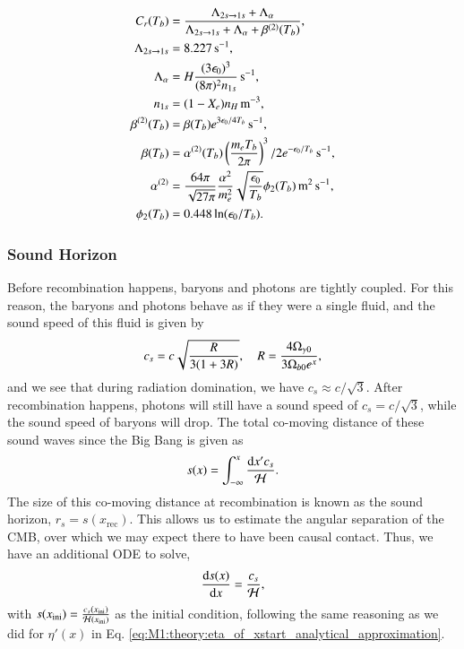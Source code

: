 \begin{subequations}
    \begin{align}
        C_r(T_b) &= \frac{\Lambda_{2s\to1s} + \Lambda_\alpha}{\Lambda_{2s\to1s} + \Lambda_\alpha + \beta^{(2)}(T_b)}, \\
        \Lambda_{2s\to1s} &= 8.227\,\mathrm{s^{-1}}, \\
        \Lambda_\alpha &= H \frac{(3\epsilon_0)^3}{(8\pi)^2 n_{1s}}\,\mathrm{s^{-1}}, \\
        n_{1s} &= (1-X_e) n_H \,\mathrm{m^{-3}}, \\
        \beta^{(2)}(T_b) &= \beta(T_b) e^{3\epsilon_0/4T_b} \,\mathrm{s^{-1}},\\
        \beta(T_b) &= \alpha^{(2)}(T_b) \left( \frac{m_e T_b}{2\pi} \right)^3/2 e^{-\epsilon_0/T_b} \,\mathrm{s^{-1}}, \\
        \alpha^{(2)} &= \frac{64\pi}{\sqrt{27\pi}} \frac{\alpha^2}{m_e^2} \sqrt{\frac{\epsilon_0}{T_b}} \phi_2(T_b)\,\mathrm{m^2\,s^{-1}}, \\
        \phi_2(T_b) &= 0.448\ln(\epsilon_0/T_b).
    \end{align}
\end{subequations}
    



\subsubsection{Sound Horizon } \label{sssec:M2:sound_horizon}
Before recombination happens, baryons and photons are tightly coupled. For this reason, the baryons and photons behave as if they were a single fluid, and the sound speed of this fluid is given by 
\begin{equation} \label{eq:M2:theory:soundspeed}
    c_s = c \sqrt{\frac{R}{3(1+3R)}},\quad R = \frac{4\Omega_{\gamma 0}}{3\Omega_{b0} e^x},
\end{equation}
and we see that during radiation domination, we have $c_s \approx c/\sqrt{3}$. After recombination happens, photons will still have a sound speed of $c_s=c/\sqrt{3}$, while the sound speed of baryons will drop.  The total co-moving distance of these sound waves since the Big Bang is given as    
\begin{equation} \label{eq:M2:theory:sound_horizon_integral}
    s(x)=\int_{-\infty}^x \frac{\dd x' c_s}{\mathcal{H}}.
\end{equation}
The size of this co-moving distance at recombination is known as the sound horizon, $r_s = s(x_\mathrm{rec})$. This allows us to estimate the angular separation of the CMB, over which we may expect there to have been causal contact. Thus, we have an additional ODE to solve, 
\begin{equation} \label{eq:M2:theory:sound_horizon_ode}
    \dv{s(x)}{x} = \frac{c_s}{\mathcal{H}},
\end{equation}
with $s(x_\mathrm{ini})=\frac{c_s(x_\mathrm{ini})}{\mathcal{H}(x_\mathrm{ini})}$ as the initial condition, following the same reasoning as we did for $\eta'(x)$ in Eq. \eqref{eq:M1:theory:eta_of_xstart_analytical_approximation}. 
